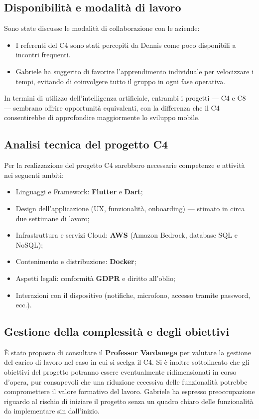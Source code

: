 \documentclass[a4paper,12pt]{article}
\begin{document}
\subsection{Disponibilità e modalità di lavoro}
Sono state discusse le modalità di collaborazione con le aziende:
\begin{itemize}
    \item I referenti del C4 sono stati percepiti da Dennis come poco disponibili a incontri frequenti.
    \item Gabriele ha suggerito di favorire l’apprendimento individuale per velocizzare i tempi, evitando di coinvolgere tutto il gruppo in ogni fase operativa.
\end{itemize}
In termini di utilizzo dell’intelligenza artificiale, entrambi i progetti — C4 e C8 — sembrano offrire opportunità equivalenti, con la differenza che il C4 consentirebbe di approfondire maggiormente lo sviluppo mobile.

\subsection{Analisi tecnica del progetto C4}
Per la realizzazione del progetto C4 sarebbero necessarie competenze e attività nei seguenti ambiti:
\begin{itemize}
    \item Linguaggi e Framework: \textbf{Flutter} e \textbf{Dart};
    \item Design dell’applicazione (UX, funzionalità, onboarding) — stimato in circa due settimane di lavoro;
    \item Infrastruttura e servizi Cloud: \textbf{AWS} (Amazon Bedrock, database SQL e NoSQL);
    \item Contenimento e distribuzione: \textbf{Docker};
    \item Aspetti legali: conformità \textbf{GDPR} e diritto all’oblio;
    \item Interazioni con il dispositivo (notifiche, microfono, accesso tramite password, ecc.).
\end{itemize}

\subsection{Gestione della complessità e degli obiettivi}
È stato proposto di consultare il \textbf{Professor Vardanega} per valutare la gestione del carico di lavoro nel caso in cui si scelga il C4.  
Si è inoltre sottolineato che gli obiettivi del progetto potranno essere eventualmente ridimensionati in corso d’opera, pur consapevoli che una riduzione eccessiva delle funzionalità potrebbe compromettere il valore formativo del lavoro.  
Gabriele ha espresso preoccupazione riguardo al rischio di iniziare il progetto senza un quadro chiaro delle funzionalità da implementare sin dall’inizio.
\end{document}
